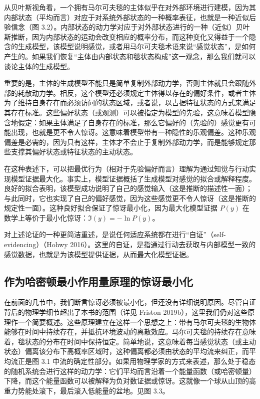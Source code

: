 从贝叶斯视角看，一个拥有马尔可夫毯的主体似乎在对外部环境进行建模，因为其内部状态（平均而言）对应于对系统外部状态的一种概率表征，也就是一种近似后验信念（图 3.2）。内部状态的动力学对应于对外部状态进行的一种（近似）贝叶斯推断，因为内部状态的运动会改变相应的概率分布，而这种变化又得益于一个隐含的生成模型，该模型说明感觉，或者用马尔可夫毯术语来说“感觉状态”，是如何产生的。如果我们恢复“主体由内部状态和毯状态构成”这一观念，那么我们就可以谈论主体的生成模型。

重要的是，主体的生成模型不能只是简单复制外部动力学，否则主体就只会跟随外部的耗散动力学。相反，这个模型还必须规定主体得以存在的偏好条件，或者主体为了维持自身存在而必须访问的状态区域，或者说，以占据特征状态的方式来满足其存在标准。这些偏好状态（或观测）可以被指定为模型的先验，这意味着模型隐含地假定：如果主体满足了自身存在的标准，那么它偏好的（先验的）感觉更有可能出现，也就是更不令人惊讶。这意味着模型带有一种隐性的乐观偏差。这种乐观偏差是必需的，因为只有这样，主体才不会止于复制外部动力学，而是能够规定那些支撑其偏好状态或特征状态的主动状态。

在这种表述下，可以把最优行为（相对于先验偏好而言）理解为通过知觉与行动实现模型证据最大化。事实上，模型证据概括了生成模型对感觉的拟合或解释程度。良好的拟合表明，该模型成功说明了自己的感觉输入（这是推断的描述性一面）；与此同时，它也实现了自己的偏好感觉，因为这些感觉更不令人惊讶（这是推断的规定性一面）。这种良好拟合保证了惊讶最小化，因为最大化模型证据 $P(y)$ 在数学上等价于最小化惊讶：$\Im(y) = -\ln P(y)$。

对上述论证的一种更简洁重述，是说任何适应系统都在进行“自证”（self-evidencing）（Hohwy 2016）。这里的自证，是指通过行动去获取与内部模型一致的感觉数据，也就是为该模型提供证据，从而最大化模型证据。

\subsection{作为哈密顿最小作用量原理的惊讶最小化}

在前面的几节中，我们断言惊讶必须被最小化，但还没有详细说明原因。尽管自证背后的物理学细节超出了本书的范围（详见 Friston 2019b），这里我们仍对这些原理作一个简要概述。这些原理建立在这样一个思想之上：带有马尔可夫毯的生物体能够在时间中持续存在，并抵抗环境波动的离散效应。马尔可夫毯的持续存在意味着，毯状态的分布在时间中保持恒定。简单地说，这意味着每当感觉状态（或主动状态）偏离该分布下高概率区域时，这种偏离都必须由状态的平均流来纠正，而平均流正是图 3.1 中流的确定性部分。如果用物理学家的方式来表述，那么处于稳态的随机系统会进行这样的动力学：它们平均而言沿着一个能量函数（或哈密顿量）下降，而这个能量函数可以被解释为负对数证据或惊讶。这就像一个球从山顶的高重力势能处滚下，最后滚入低能量的盆地。见图 3.3。

